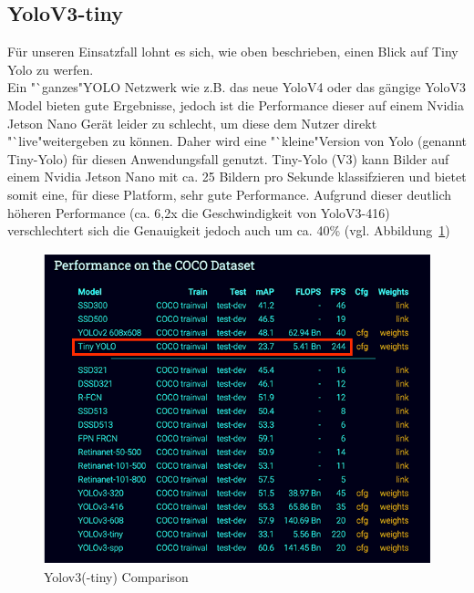 \documentclass[a4paper,oneside,12pt]{report}
\begin{document}
\begin{onehalfspace}
		\subsection{YoloV3-tiny}
		Für unseren Einsatzfall lohnt es sich, wie oben beschrieben, einen Blick auf Tiny Yolo zu werfen. \\
		Ein "`ganzes"\space YOLO Netzwerk wie z.B. das neue YoloV4 oder das gängige YoloV3 Model bieten gute Ergebnisse, jedoch ist die Performance dieser auf einem Nvidia Jetson Nano Gerät leider zu schlecht, um diese dem Nutzer direkt "`live"\space weitergeben zu können.
		Daher wird eine "`kleine"\space Version von Yolo (genannt Tiny-Yolo) für diesen Anwendungsfall genutzt. Tiny-Yolo (V3) kann Bilder auf einem Nvidia Jetson Nano mit ca. 25 Bildern pro Sekunde klassifzieren und bietet somit eine, für diese Platform, sehr gute Performance.\clearpage
		Aufgrund dieser deutlich höheren Performance (ca. 6,2x die Geschwindigkeit von YoloV3-416) verschlechtert sich die Genauigkeit jedoch auch um ca. 40\% (vgl. Abbildung~\ref{fig:yolov3-tiny})\\
		\begin{figure}[h!]
			\includegraphics[scale=0.7]{YoloV3-tiny.png}
			\caption{Yolov3(-tiny) Comparison}
			\label{fig:yolov3-tiny}
		\end{figure}
	\end{onehalfspace}
\end{document}
